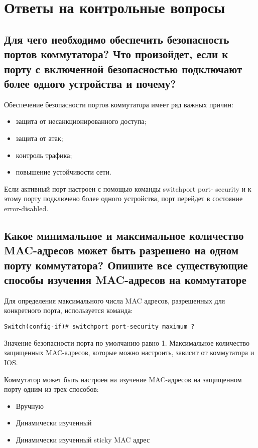 \section{Ответы на контрольные вопросы}

\subsection{Для чего необходимо обеспечить безопасность портов
коммутатора? Что произойдет, если к порту с включенной
безопасностью подключают более одного устройства и почему?}

Обеспечение безопасности портов коммутатора имеет ряд важных
причин:

\begin{itemize}
    \item защита от несанкционированного доступа;
    \item защита от атак;
    \item контроль трафика;
    \item повышение устойчивости сети.
\end{itemize}

Если активный порт настроен с помощью команды switchport port-
security и к этому порту подключено более одного устройства, порт перейдет
в состояние error-disabled.

\subsection{Какое минимальное и максимальное количество MAC-адресов
может быть разрешено на одном порту коммутатора? Опишите
все существующие способы изучения MAC-адресов на
коммутаторе}

Для определения максимального числа MAC адресов, разрешенных для
конкретного порта, используется команда:

\begin{verbatim}
Switch(config-if)# switchport port-security maximum ?
\end{verbatim}

Значение безопасности порта по умолчанию равно 1. Максимальное
количество защищенных MAC-адресов, которые можно настроить, зависит
от коммутатора и IOS.

Коммутатор может быть настроен на изучение MAC-адресов на
защищенном порту одним из трех способов:

\begin{itemize}
    \item Вручную
    \item Динамически изученный
    \item Динамически изученный sticky MAC адрес
\end{itemize}

